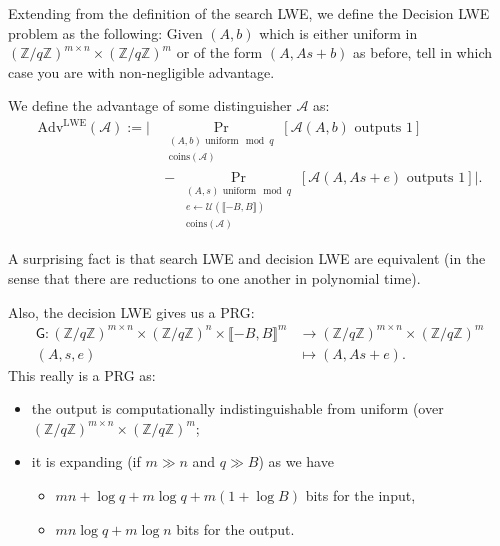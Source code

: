 \documentclass[./main]{subfiles}
\begin{document}
  \begin{defn}
    Extending from the definition of the search LWE, we define the Decision LWE problem as the following: Given $(A, b)$ which is either uniform in $(\mathds{Z} / q \mathds{Z})^{m \times n} \times (\mathds{Z}/q\mathds{Z})^m$ or of the form $(A, As + b)$ as before, tell in which case you are with non-negligible advantage.

    We define the advantage of some distinguisher $\mathcal{A}$ as:
    \begin{align*}
      \mathrm{Adv}^\mathrm{LWE}(\mathcal{A}) := \Big| &\Pr_{\substack{(A, b) \text{ uniform} \mod q \\ \mathrm{coins}(\mathcal{A})}}[\mathcal{A}(A, b) \text{ outputs } 1]\\
      &{}- \Pr_{\substack{(A, s) \text{ uniform} \mod q\\ e \gets \mathcal{U}(\llbracket {-B}, B\rrbracket)\\    \mathrm{coins}(\mathcal{A})}}[\mathcal{A}(A, As + e) \text{ outputs } 1]
      \Big|
    .\end{align*}
  \end{defn}

  A surprising fact is that search LWE and decision LWE are equivalent (in the sense that there are reductions to one another in polynomial time).

  Also, the decision LWE gives us a PRG:
  \begin{align*}
    \mathsf{G}: (\mathds{Z} / q \mathds{Z})^{m \times n} \times (\mathds{Z} / q \mathds{Z})^n \times \llbracket {-B}, B\rrbracket^m  &\longrightarrow (\mathds{Z} / q \mathds{Z})^{m \times n} \times (\mathds{Z} / q \mathds{Z})^m \\
    (A, s, e) &\longmapsto (A, A s + e)
  .\end{align*}
  This really is a PRG as:
  \begin{itemize}
    \item the output is computationally indistinguishable from uniform (over $(\mathds{Z}/q \mathds{Z})^{m \times n} \times (\mathds{Z} / q \mathds{Z})^m$;
    \item it is expanding (if $m \gg n$ and $q \gg B$) as we have
      \begin{itemize}
        \item $m n + \log q + m \log q + m (1 + \log B)$ bits for the input,
        \item  $mn \log q + m \log n$ bits for the output.
      \end{itemize}
  \end{itemize}
\end{document}
